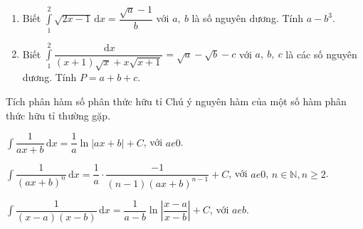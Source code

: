 \begin{bt}%
		\begin{enumerate}
		\item Biết $\displaystyle\int\limits_{1}^2 \sqrt{2x-1}\mathrm{\,d}x=\dfrac{\sqrt{a}-1}{b}$ với $a,~b$ là số nguyên dương. Tính $a-b^3$. 
		
		\item Biết $\displaystyle\int\limits_{1}^2 \dfrac{\mathrm{\,d}x}{(x+1)\sqrt{x}+x\sqrt{x+1}}=\sqrt{a}-\sqrt{b}-c$ với $a,~b,~c$ là các số nguyên dương. Tính $P=a+b+c$. 
		
\end{enumerate}
\end{bt}
\begin{dang}{Tích phân hàm số phân thức hữu tỉ}
	Chú ý nguyên hàm của một số hàm phân thức hữu tỉ thường gặp.
	\begin{enumEX}{1}
		\item $\displaystyle \int \dfrac{1}{ax+b}\mathrm{\,d}x= \dfrac{1}{a}\ln|ax+b|+C$, với $ a  e 0 $.
		\item  $\displaystyle \int \dfrac{1}{(ax+b)^n}\mathrm{\,d}x= \dfrac{1}{a}\cdot \dfrac{-1}{(n-1)(ax+b)^{n-1}}+C$, với $ a  e 0 $, $ n \in \mathbb{N}, n \geq 2 $.
		\item $\displaystyle \int \dfrac{1}{(x-a)(x-b)}\mathrm{\,d}x=\dfrac{1}{a-b}\ln{\left| \dfrac{x-a}{x-b}\right|}+C$, với $ a  e b $.
	\end{enumEX}	
\end{dang}
